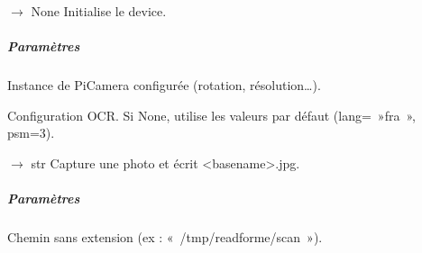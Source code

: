 \documentclass[letterpaper,10pt,french]{sphinxmanual}
\begin{document}
\begin{fulllineitems}
\begin{fulllineitems}
\label{\detokenize{api/hardware.devices:hardware.devices.text_reader_device.TextReaderDevice.__init__}}
\pysigstartsignatures
\pysiglinewithargsret
{}
{\sphinxparamcomma {}\sphinxparamcomma {}}
{{ $\rightarrow$ None}}
\pysigstopsignatures
\sphinxAtStartPar
Initialise le device.


\subparagraph{Paramètres}
\label{\detokenize{api/hardware.devices:id7}}\begin{description}
\sphinxAtStartPar
Instance de PiCamera configurée (rotation, résolution…).

\sphinxAtStartPar
Configuration OCR. Si None, utilise les valeurs par défaut
(lang= »fra », psm=3).

\end{description}

\end{fulllineitems}


\begin{fulllineitems}
\label{\detokenize{api/hardware.devices:hardware.devices.text_reader_device.TextReaderDevice.capture}}
\pysigstartsignatures
\pysiglinewithargsret
{}
{}
{{ $\rightarrow$ str}}
\pysigstopsignatures
\sphinxAtStartPar
Capture une photo et écrit \textless{}basename\textgreater{}.jpg.


\subparagraph{Paramètres}
\label{\detokenize{api/hardware.devices:id8}}\begin{description}
\sphinxAtStartPar
Chemin sans extension (ex : « /tmp/readforme/scan »).


\end{description}
\end{fulllineitems}
\end{fulllineitems}
\end{document}
